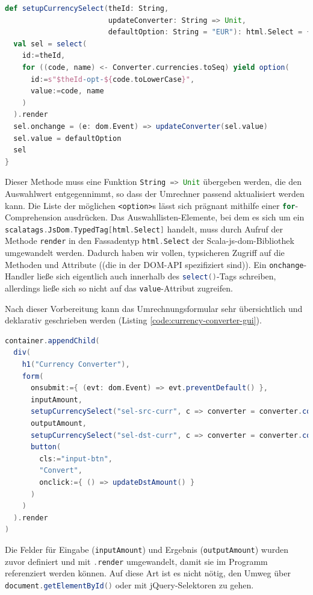 \documentclass[a4paper, 12pt, hidelinks, listof=totoc, listoftables=totoc, bibliography=totoc]{scrreprt}
\newcommand{\scala}[1]{\lstinline[language=Scala, style=inline]|#1|}
\newcommand{\html}[1]{\lstinline[language=HTML5, style=inline]|#1|}
\begin{document}
\begin{lstlisting}[language=Scala, caption={Methode zur Erzeugung eines \html{<select>}-Elements.}, label={code:setupCurrencySelect}]
def setupCurrencySelect(theId: String,
                        updateConverter: String => Unit,
                        defaultOption: String = "EUR"): html.Select = {
  val sel = select(
    id:=theId,
    for ((code, name) <- Converter.currencies.toSeq) yield option(
      id:=s"$theId-opt-${code.toLowerCase}",
      value:=code, name
    )
  ).render
  sel.onchange = (e: dom.Event) => updateConverter(sel.value)
  sel.value = defaultOption
  sel
}
\end{lstlisting}

Dieser Methode muss eine Funktion \scala{String => Unit} übergeben werden, die den Auswahlwert entgegennimmt, so dass der Umrechner passend aktualisiert werden kann. Die Liste der möglichen \html{<option>}s lässt sich prägnant mithilfe einer \scala{for}-Comprehension ausdrücken. Das Auswahllisten-Elemente, bei dem es sich um ein \scala{scalatags.JsDom.TypedTag[html.Select]} handelt, muss durch Aufruf der Methode \scala{render} in den Fassadentyp \scala{html.Select} der Scala-js-dom-Bibliothek umgewandelt werden. Dadurch haben wir vollen, typsicheren Zugriff auf die Methoden und Attribute ((die in der DOM-API spezifiziert sind)). Ein \scala{onchange}-Handler ließe sich eigentlich auch innerhalb des \scala{select()}-Tags schreiben, allerdings ließe sich so nicht auf das \scala{value}-Attribut zugreifen.

Nach dieser Vorbereitung kann das Umrechnungsformular sehr übersichtlich und deklarativ geschrieben werden (Listing \ref{code:currency-converter-gui}).

\begin{lstlisting}[language=Scala, caption={Deklaration eines Formulars zur Währungsumrechnung mit ScalaTags.}, label={code:currency-converter-gui}]
container.appendChild(
  div(
    h1("Currency Converter"),
    form(
      onsubmit:={ (evt: dom.Event) => evt.preventDefault() },
      inputAmount,
      setupCurrencySelect("sel-src-curr", c => converter = converter.copy(srcCurr = c)),
      outputAmount,
      setupCurrencySelect("sel-dst-curr", c => converter = converter.copy(dstCurr = c)),
      button(
        cls:="input-btn",
        "Convert",
        onclick:={ () => updateDstAmount() }
      )
    )
  ).render
)
\end{lstlisting}

Die Felder für Eingabe (\scala{inputAmount}) und Ergebnis (\scala{outputAmount}) wurden zuvor definiert und mit \scala{.render} umgewandelt, damit sie im Programm referenziert werden können. Auf diese Art ist es nicht nötig, den Umweg über \scala{document.getElementById()} oder mit jQuery-Selektoren zu gehen.
\end{document}
